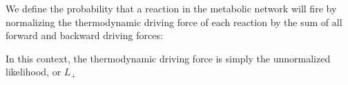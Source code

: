 
We define the probability that a reaction in the metabolic network will fire by normalizing the thermodynamic driving force of each reaction by the sum of all forward and backward driving forces:

In this context, the thermodynamic driving force is simply the unnormalized likelihood, or \(L_+\)